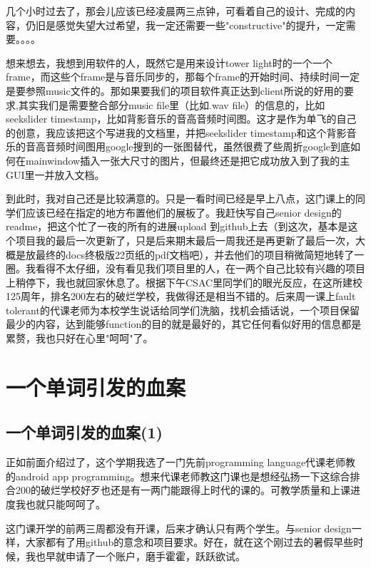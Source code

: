 \documentclass[12pt]{book}
\begin{document}
几个小时过去了，那会儿应该已经凌晨两三点钟，可看着自己的设计、完成的内容，仍旧是感觉失望大过希望，我一定还需要一些"constructive"的提升，一定需要。。。。

想来想去，我想到用软件的人，既然它是用来设计tower light时的一个一个frame，而这些个frame是与音乐同步的，那每个frame的开始时间、持续时间一定是要参照music文件的。那如果要我们的项目软件真正达到client所说的好用的要求,其实我们是需要整合部分music file里（比如.wav file）的信息的，比如seekslider timestamp，比如背影音乐的音高音频时间图。这才是作为单飞的自己的创意，我应该把这个写进我的文档里，并把seekslider timestamp和这个背影音乐的音高音频时间图用google搜到的一张图替代，虽然很费了些周折google到底如何在mainwindow插入一张大尺寸的图片，但最终还是把它成功放入到了我的主GUI里一并放入文档。

到此时，我对自己还是比较满意的。只是一看时间已经是早上八点，这门课上的同学们应该已经在指定的地方布置他们的展板了。我赶快写自己senior design的readme，把这个忙了一夜的所有的进展upload 到github上去（到这次，基本是这个项目我的最后一次更新了，只是后来期末最后一周我还是再更新了最后一次，大概是放最终的docs终极版22页纸的pdf文档吧），并去他们的项目稍微简短地转了一圈。我看得不太仔细，没有看见我们项目里的人，在一两个自己比较有兴趣的项目上稍停下，我也就回家休息了。根据下午CSAC里同学们的眼光反应，在这所建校125周年，排名200左右的破烂学校，我做得还是相当不错的。后来周一课上fault tolerant的代课老师为本校学生说话给同学们洗脑，找机会插话说，一个项目保留最少的内容，达到能够function的目的就是最好的，其它任何看似好用的信息都是累赘，我也只好在心里"呵呵"了。

\chapter{一个单词引发的血案}
\label{sec-36}
\section{一个单词引发的血案(1)}
\label{sec-36-1}
正如前面介绍过了，这个学期我选了一门先前programming language代课老师教的android app programming。想来代课老师教这门课也是想经弘扬一下这综合排合200的破烂学校好歹也还是有一两门能跟得上时代的课的。可教学质量和上课进度我也就只能呵呵了。

这门课开学的前两三周都没有开课，后来才确认只有两个学生。与senior design一样，大家都有了用github的意念和项目要求。好在，就在这个刚过去的暑假早些时候，我也早就申请了一个账户，磨手霍霍，跃跃欲试。
\end{document}
